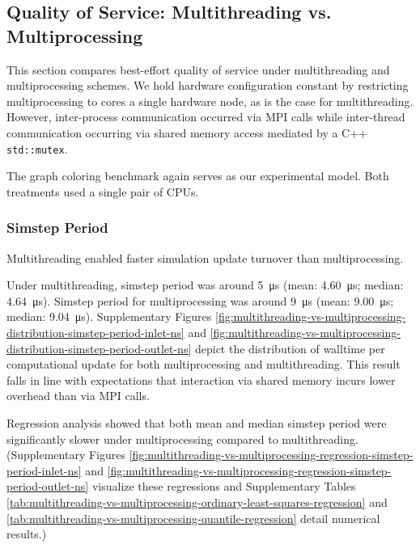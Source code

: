 \subsection{Quality of Service: Multithreading vs. Multiprocessing}
\label{sec:multithreading-vs-multiprocessing}

This section compares best-effort quality of service under multithreading and multiprocessing schemes.
We hold hardware configuration constant by restricting multiprocessing to cores a single hardware node, as is the case for multithreading.
However, inter-process communication occurred via MPI calls while inter-thread communication occurring via shared memory access mediated by a C++ \texttt{std::mutex}.

The graph coloring benchmark again serves as our experimental model.
Both treatments used a single pair of CPUs.

\subsubsection{Simstep Period}

Multithreading enabled faster simulation update turnover than multiprocessing.

Under multithreading, simstep period was around \SI{5}{\micro\second} (mean: \SI{4.60}{\micro\second}; median: \SI{4.64}{\micro\second}).
Simstep period for multiprocessing was around \SI{9}{\micro\second} (mean: \SI{9.00}{\micro\second}; median: \SI{9.04}{\micro\second}).
Supplementary Figures \ref{fig:multithreading-vs-multiprocessing-distribution-simstep-period-inlet-ns} and \ref{fig:multithreading-vs-multiprocessing-distribution-simstep-period-outlet-ns} depict the distribution of walltime per computational update for both multiprocessing and multithreading.
This result falls in line with expectations that interaction via shared memory incurs lower overhead than via MPI calls.

Regression analysis showed that both mean and median simstep period were significantly slower under multiprocessing compared to multithreading.
(Supplementary Figures \ref{fig:multithreading-vs-multiprocessing-regression-simstep-period-inlet-ns} and \ref{fig:multithreading-vs-multiprocessing-regression-simstep-period-outlet-ns} visualize these regressions and Supplementary Tables \ref{tab:multithreading-vs-multiprocessing-ordinary-least-squares-regression} and \ref{tab:multithreading-vs-multiprocessing-quantile-regression} detail numerical results.)

